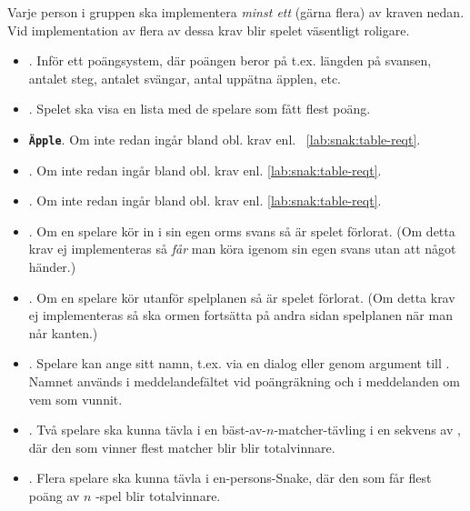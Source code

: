 Varje person i gruppen ska implementera \emph{minst ett} (gärna flera) av kraven nedan. Vid implementation av flera av dessa krav blir spelet väsentligt roligare.
\begin{itemize}[nosep, label={$\square$}]

\item \textbf{}. Inför ett poängsystem, där poängen beror på t.ex. längden på svansen, antalet steg, antalet svängar, antal uppätna äpplen, etc.

\item \textbf{}. Spelet ska visa en lista med de spelare som fått flest poäng.

\item \texttt{\textbf{Äpple}}. Om inte redan ingår bland obl. krav enl.~ \ref{lab:snak:table-reqt}.

\item \textbf{}. Om inte redan ingår bland obl. krav enl. 
\ref{lab:snak:table-reqt}.

\item \textbf{}. Om inte redan ingår bland obl. krav enl. 
\ref{lab:snak:table-reqt}.

\item \textbf{}. Om en spelare kör in i sin egen orms svans så är spelet förlorat. (Om detta krav ej implementeras så \emph{får} man köra igenom sin egen svans utan att något händer.)

\item \textbf{}. Om en spelare kör utanför spelplanen så är spelet förlorat. (Om detta krav ej implementeras så ska ormen fortsätta på andra sidan spelplanen när man når kanten.)

\item \textbf{}. Spelare kan ange sitt namn, t.ex. via en dialog eller genom argument till . Namnet används i meddelandefältet vid poängräkning och i meddelanden om vem som vunnit.

\item \textbf{}. Två spelare ska kunna tävla i en bäst-av-$n$-matcher-tävling i en sekvens av , där den som vinner flest matcher blir blir totalvinnare.

\item \textbf{}. Flera spelare ska kunna tävla i en-persons-Snake, där den som får flest poäng av $n$ -spel blir totalvinnare.


\end{itemize}
